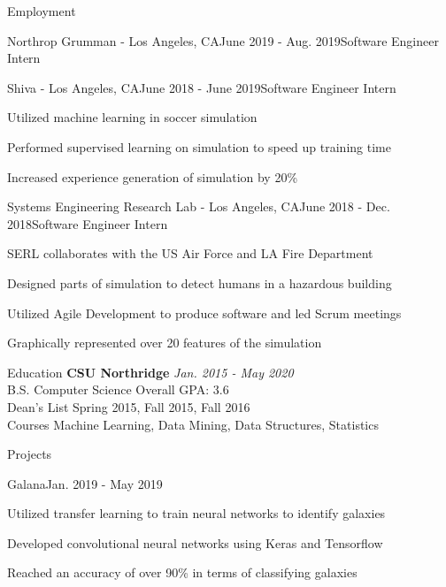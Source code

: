 \documentclass{resume}
\begin{document}
\begin{rSection}{Employment}
\begin{rSubsection}{Northrop Grumman - Los Angeles, CA}{June 2019 - Aug. 2019}{Software Engineer Intern}{}
    \end{rSubsection}
    \begin{rSubsection}{Shiva - Los Angeles, CA}{June 2018 - June 2019}{Software Engineer Intern}{}
        \item Utilized machine learning in soccer simulation
        \item Performed supervised learning on simulation to speed up training time
        \item Increased experience generation of simulation by 20\%
    \end{rSubsection}
    \begin{rSubsection}{Systems Engineering Research Lab - Los Angeles, CA}{June 2018 - Dec. 2018}{Software Engineer Intern}{}
        \item SERL collaborates with the US Air Force and LA Fire Department
        \item Designed parts of simulation to detect humans in a hazardous building
        \item Utilized Agile Development to produce software and led Scrum meetings
        \item Graphically represented over 20 features of the simulation
    \end{rSubsection}
\end{rSection}

\begin{rSection}{Education}
    {\bf CSU Northridge} \hfill {\em Jan. 2015 - May 2020} 
    \\ B.S. Computer Science \hfill { Overall GPA: 3.6 }
    \\ Dean's List \hfill {Spring 2015, Fall 2015, Fall 2016}
    \\ Courses \hfill {Machine Learning, Data Mining, Data Structures, Statistics}
\end{rSection}

\begin{rSection}{Projects}
    \begin{rSubsection}{Galana}{Jan. 2019 - May 2019}{}{}
        \item Utilized transfer learning to train neural networks to identify galaxies
        \item Developed convolutional neural networks using Keras and Tensorflow
        \item Reached an accuracy of over 90\% in terms of classifying galaxies
    \end{rSubsection}
\end{rSection}
\end{document}
